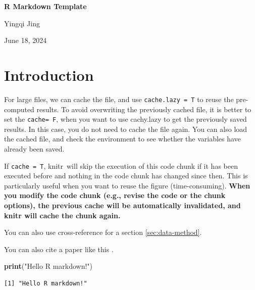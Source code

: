 \documentclass[
]{article}
\newenvironment{Shaded}{\begin{snugshade}}{\end{snugshade}}
\newcommand{\FunctionTok}[1]{\textcolor[rgb]{0.13,0.29,0.53}{\textbf{#1}}}
\newcommand{\NormalTok}[1]{#1}
\newcommand{\StringTok}[1]{\textcolor[rgb]{0.31,0.60,0.02}{#1}}
\begin{document}
\thispagestyle{empty}

\begin{center}
{\Large\sffamily\bfseries{R Markdown Template}


{\normalsize Yingqi Jing}

}

{\large June 18, 2024}
\end{center}
\vspace{6pt}


\setcounter{footnote}{0}







\clearpage

\section{Introduction}\label{introduction}

For large files, we can cache the file, and use \texttt{cache.lazy\ =\ T} to reuse the pre-computed results. To avoid overwriting the previously cached file, it is better to set the \texttt{cache=\ F}, when you want to use cachy.lazy to get the previously saved results. In this case, you do not need to cache the file again. You can also load the cached file, and check the environment to see whether the variables have already been saved.

If \texttt{cache\ =\ T}, knitr~will skip the execution of this code chunk if it has been executed before and nothing in the code chunk has changed since then. This is particularly useful when you want to reuse the figure (time-consuming). \textbf{When you modify the code chunk (e.g., revise the code or the chunk options), the previous cache will be automatically invalidated, and knitr will cache the chunk again.}

You can also use cross-reference for a section \ref{sec:data-method}.

You can also cite a paper like this \autocite{Kirby2016}.

\begin{Shaded}
\begin{Highlighting}[]
\FunctionTok{print}\NormalTok{(}\StringTok{"Hello R markdown!"}\NormalTok{)}
\end{Highlighting}
\end{Shaded}

\begin{verbatim}
[1] "Hello R markdown!"
\end{verbatim}
\end{document}
